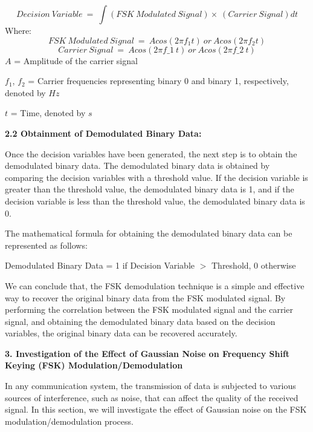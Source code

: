 \documentclass{article} %
\begin{document}
\noindent 
\[Decision\ Variable\ =\ \int \left(FSK\ Modulated\ Signal\right)\times \ \left(Carrier\ Signal\right)dt\] 
Where:
\[FSK\ Modulated\ Signal\ =\ Acos\left(2\pi f_1t\right)\ or\ Acos\left(2\pi f_2t\right)\] 
\[Carrier\ Signal\ =\ Acos(2\pi f\_1\ t)\ or\ Acos(2\pi f\_2\ t)\] 
$A$ = Amplitude of the carrier signal

\noindent $f_1$, $f_2$ = Carrier frequencies representing binary 0 and binary 1, respectively, denoted by $Hz$

\noindent $t$ = Time, denoted by $s$

\noindent 

\noindent \textbf{2.2 Obtainment of Demodulated Binary Data:}

\noindent Once the decision variables have been generated, the next step is to obtain the demodulated binary data. The demodulated binary data is obtained by comparing the decision variables with a threshold value. If the decision variable is greater than the threshold value, the demodulated binary data is 1, and if the decision variable is less than the threshold value, the demodulated binary data is 0.

\noindent The mathematical formula for obtaining the demodulated binary data can be represented as follows:

\noindent 

\noindent Demodulated Binary Data = 1 if Decision Variable $\mathrm{>}$ Threshold, 0 otherwise

\noindent 

\noindent We can conclude that, the FSK demodulation technique is a simple and effective way to recover the original binary data from the FSK modulated signal. By performing the correlation between the FSK modulated signal and the carrier signal, and obtaining the demodulated binary data based on the decision variables, the original binary data can be recovered accurately.

\noindent 

\noindent \textbf{3. Investigation of the Effect of Gaussian Noise on Frequency Shift Keying (FSK) Modulation/Demodulation}

\noindent In any communication system, the transmission of data is subjected to various sources of interference, such as noise, that can affect the quality of the received signal. In this section, we will investigate the effect of Gaussian noise on the FSK modulation/demodulation process.

\noindent 
\end{document}
